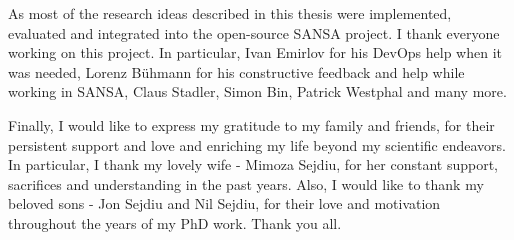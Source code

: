 As most of the research ideas described in this thesis were implemented, evaluated and integrated into the open-source SANSA project.
I thank everyone working on this project.
In particular, Ivan Emirlov for his DevOps help when it was needed, Lorenz B\"uhmann for his constructive feedback and help while working in SANSA, Claus Stadler, Simon Bin, Patrick Westphal and many more.

Finally, I would like to express my gratitude to my family and friends, for their persistent support and love and enriching my life beyond my scientific endeavors.
In particular, I thank my lovely wife - Mimoza Sejdiu, for her constant support, sacrifices and understanding in the past years.
Also, I would like to thank my beloved sons - Jon Sejdiu and Nil Sejdiu, for their love and motivation throughout the years of my PhD work.
Thank you all.


\thispagestyle{empty}
{\raggedleft\vfill\itshape{}\par
}
